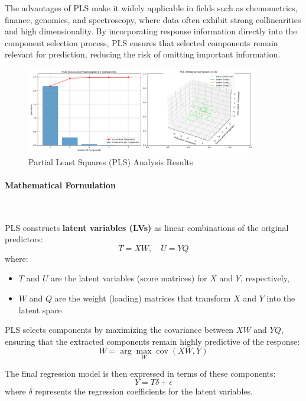 \documentclass[11pt,twoside,a4paper]{article}
\begin{document}
The advantages of PLS make it widely applicable in fields such as chemometrics, finance, genomics, and spectroscopy, where data often exhibit strong collinearities and high dimensionality. By incorporating response information directly into the component selection process, PLS ensures that selected components remain relevant for prediction, reducing the risk of omitting important information.

\begin{figure}[H]
    \centering
    \includegraphics[width=0.9\textwidth]{PLS_Selected_Analysis.png}
    \caption{Partial Least Squares (PLS) Analysis Results}
    \label{fig:PLS_analysis}
\end{figure}

\paragraph {Mathematical Formulation} \ \

PLS constructs \textbf{latent variables (LVs)} as linear combinations of the original predictors:
\begin{equation}
T = XW, \quad U = YQ
\end{equation}
where:
\begin{itemize}
    \item \( T \) and \( U \) are the latent variables (score matrices) for \( X \) and \( Y \), respectively,
    \item \( W \) and \( Q \) are the weight (loading) matrices that transform \( X \) and \( Y \) into the latent space.
\end{itemize}

PLS selects components by maximizing the covariance between \( XW \) and \( YQ \), ensuring that the extracted components remain highly predictive of the response:
\begin{equation}
W = \arg\max_W \operatorname{cov}(XW, Y)
\end{equation}

The final regression model is then expressed in terms of these components:
\begin{equation}
Y = T \delta + \epsilon
\end{equation}
where \( \delta \) represents the regression coefficients for the latent variables.
\end{document}
